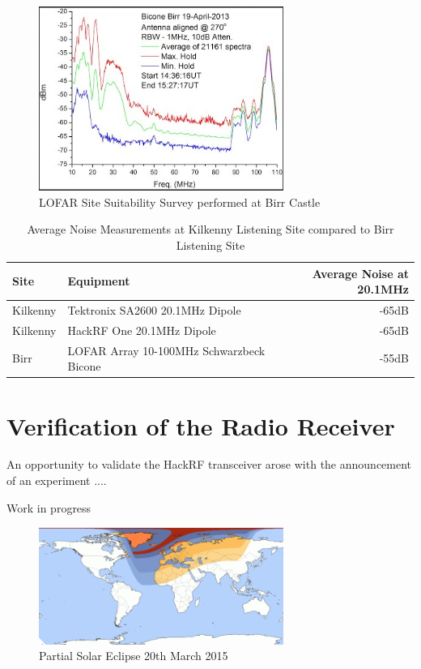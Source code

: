 \documentclass[runningheads,a4paper]{llncs}
\begin{document}
%
\begin{figure}[here]
\centering
\includegraphics[width=8cm]{images/35}
\caption{LOFAR Site Suitability Survey performed at Birr Castle \citep{craf-13}}
\label{fig:site_survey_lofar}
\end{figure}
%

%
\begin{table}
  \centering
  \begin{tabular}{p{2cm} l r}
    \toprule
    Site & Equipment & Average Noise at 20.1MHz \\ \midrule
    Kilkenny & Tektronix SA2600 20.1MHz Dipole & -65dB  \\
    Kilkenny & HackRF One 20.1MHz Dipole & -65dB \\
    Birr & LOFAR Array 10-100MHz Schwarzbeck Bicone & -55dB \\
    \bottomrule
  \end{tabular}
  \caption{Average Noise Measurements at Kilkenny Listening Site compared to Birr Listening Site \citep{craf-13}}
  \label{tab:site_survey}
\end{table}
%


\section*{Verification of the Radio Receiver}
An opportunity to validate the HackRF transceiver arose with the announcement of an experiment ....

Work in progress

%
\begin{figure}[here]
\centering
\includegraphics[width=8cm]{images/41}
\caption{Partial Solar Eclipse 20th March 2015}
\label{fig:solar_eclipse_scale}
\end{figure}
%
\end{document}
